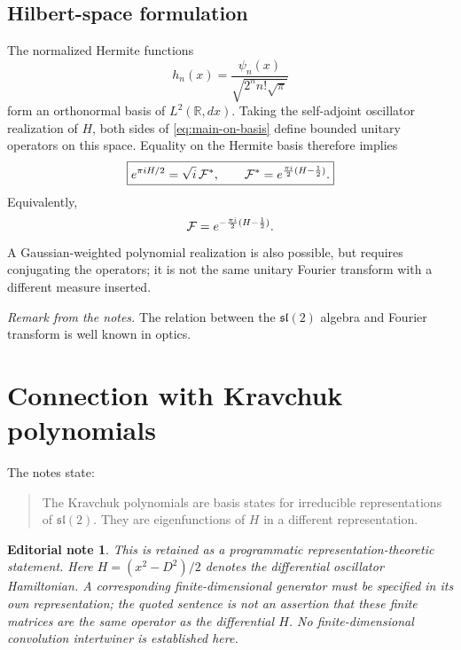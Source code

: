 \documentclass[11pt]{amsart}
\newcommand{\RR}{\mathbb R}
\newcommand{\F}{{\cal F}}
\newcommand{\Fstar}{{\cal F}^{*}}
\newtheorem*{editorial}{Editorial note}
\begin{document}
\subsection*{Hilbert-space formulation}
The normalized Hermite functions
\[
h_n(x)=\frac{\psi_n(x)}{\sqrt{2^n n!\sqrt\pi}}
\]
form an orthonormal basis of $L^2(\RR,dx)$. Taking the self-adjoint
oscillator realization of $H$, both sides of
\eqref{eq:main-on-basis} define bounded unitary operators on this
space. Equality on the Hermite basis therefore implies
\begin{equation}\label{eq:main-operator}
\boxed{e^{\pi iH/2}=\sqrt{i}\,\Fstar,\qquad
\Fstar=e^{\frac{\pi i}{2}(H-\frac12)}.}
\end{equation}
Equivalently,
\[
\F=e^{-\frac{\pi i}{2}(H-\frac12)}.
\]
A Gaussian-weighted polynomial realization is also possible, but
requires conjugating the operators; it is not the same unitary
Fourier transform with a different measure inserted.

\medskip
\noindent\textit{Remark from the notes.}
The relation between the $\mathfrak{sl}(2)$ algebra and Fourier
transform is well known in optics.

\section{Connection with Kravchuk polynomials}
The notes state:
\begin{quote}
The Kravchuk polynomials are basis states for irreducible
representations of $\mathfrak{sl}(2)$. They are eigenfunctions of
$H$ in a different representation.
\end{quote}
\begin{editorial}
This is retained as a programmatic representation-theoretic statement.
Here $H=(x^2-D^2)/2$ denotes the differential oscillator Hamiltonian.
A corresponding finite-dimensional generator must be specified in its
own representation; the quoted sentence is not an assertion that these
finite matrices are the same operator as the differential $H$.
No finite-dimensional convolution intertwiner is established here.
\end{editorial}
\end{document}
